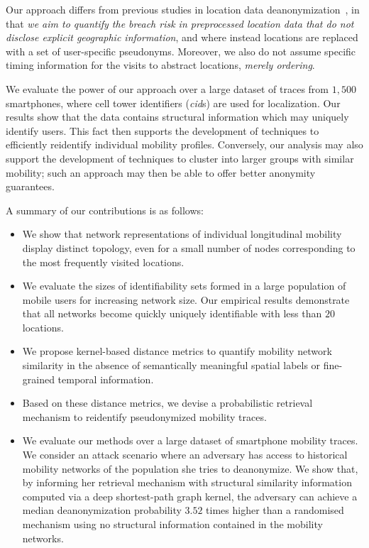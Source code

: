 Our approach differs from previous studies in location data deanonymization~\cite{Gambs2014, deMulder08, Naini2016a, Golle2009}, in that \emph{we aim to quantify the breach risk in preprocessed location data that do not disclose explicit geographic information}, and where instead locations are replaced with a set of user-specific pseudonyms.
Moreover, we also do not assume specific timing information for the visits to abstract locations, \emph{merely ordering}.

We evaluate the power of our approach over a large dataset of traces from $1,500$ smartphones, where cell tower identifiers (\emph{cid}s) are used for localization.
Our results show that the data contains structural information which may uniquely identify users.
This fact then supports the development of techniques to efficiently reidentify individual mobility profiles.
Conversely, our analysis may also support the development of techniques to cluster into larger groups with similar mobility; such an approach may then be able to offer better anonymity guarantees.

A summary of our contributions is as follows:

\begin{itemize}

\item We show that network representations of individual longitudinal mobility display distinct topology, even for a small number of nodes corresponding to the most frequently visited locations.

\item We evaluate the sizes of identifiability sets formed in a large population of mobile users for increasing network size.
Our empirical results demonstrate that all networks become quickly uniquely identifiable with less than $20$ locations.

\item We propose kernel-based distance metrics to quantify mobility network similarity in the absence of semantically meaningful spatial labels or fine-grained temporal information.

\item Based on these distance metrics, we devise a probabilistic retrieval mechanism to reidentify pseudonymized mobility traces.

\item We evaluate our methods over a large dataset of smartphone mobility traces. We consider an attack scenario where an adversary has access to historical mobility networks of the population she tries to deanonymize. We show that, by informing her retrieval mechanism with structural similarity information computed via a deep shortest-path graph kernel, the adversary can achieve a median deanonymization probability $3.52$ times higher than a randomised mechanism using no structural information contained in the mobility networks.

\end{itemize}

